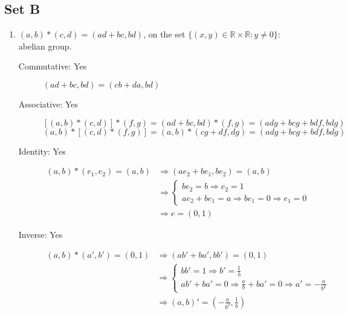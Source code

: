 \documentclass{article}
\begin{document}
\subsection*{Set B}
\begin{enumerate}
    \item $(a, b) * (c , d) = (ad + bc, bd)$, on the set $\{(x, y) \in \mathbb{R} \times \mathbb{R}: y \ne 0\}$: abelian group.
    \begin{description}
        \item [Commutative: Yes] $(ad + bc, bd) = (cb + da, bd)$
        \item [Associative: Yes]
            $$[(a, b) * (c, d)] * (f, g) = (ad + bc, bd) * (f, g) = (adg + bcg + bdf, bdg)$$
            $$(a, b) * [(c, d) * (f, g)] = (a, b) * (cg + df, dg) = (adg + bcg + bdf, bdg)$$
        \item [Identity: Yes]
            \begin{equation*}
                \begin{split}
                    (a, b) * (e_1, e_2) = (a, b) & \Rightarrow (ae_2 + be_1, be_2) = (a, b) \\
                                                 & \Rightarrow  \begin{cases}
                                                                    be_2 = b \Rightarrow e_2 = 1 \\
                                                                    ae_2 + be_1 = a \Rightarrow be_1 = 0 \Rightarrow e_1 = 0
                                                                \end{cases} \\
                                                 & \Rightarrow e = (0, 1)
                \end{split}
            \end{equation*}
        \item [Inverse: Yes]
            \begin{equation*}
                \begin{split}
                    (a, b) * (a', b') = (0, 1) & \Rightarrow (ab' + ba', bb') = (0, 1) \\
                                               & \Rightarrow \begin{cases}
                                                                bb' = 1 \Rightarrow b' = \frac{1}{b} \\
                                                                ab' + ba' = 0 \Rightarrow \frac{a}{b} + ba' = 0 \Rightarrow a' = -\frac{a}{b^2}
                                                             \end{cases} \\
                                               & \Rightarrow (a, b)' = (-\frac{a}{b^2}, \frac{1}{b})
                \end{split}
            \end{equation*}
    \end{description}
\end{enumerate}
\end{document}
